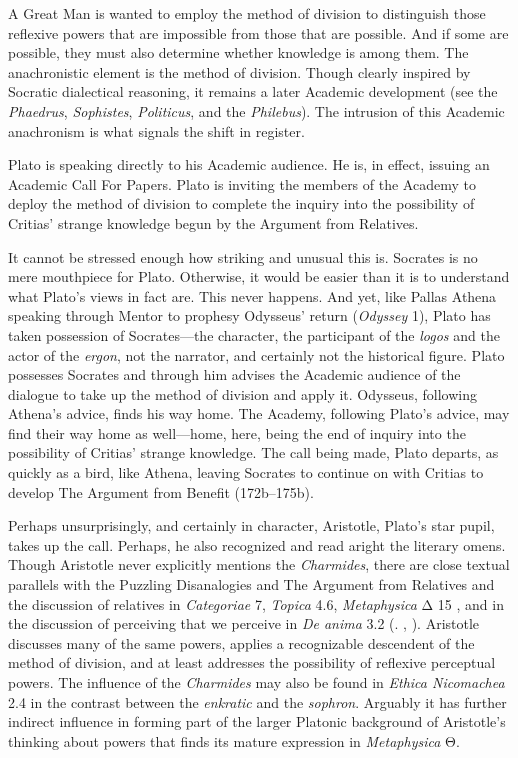 A Great Man is wanted to employ the method of division to distinguish those reflexive powers that are impossible from those that are possible. And if some are possible, they must also determine whether knowledge is among them. The anachronistic element is the method of division. Though clearly inspired by Socratic dialectical reasoning, it remains a later Academic development (see the \emph{Phaedrus}, \emph{Sophistes}, \emph{Politicus}, and the \emph{Philebus}). The intrusion of this Academic anachronism is what signals the shift in register.

Plato is speaking directly to his Academic audience. He is, in effect, issuing an Academic Call For Papers. Plato is inviting the members of the Academy to deploy the method of division to complete the inquiry into the possibility of Critias' strange knowledge begun by the Argument from Relatives. 

It cannot be stressed enough how striking and unusual this is. Socrates is no mere mouthpiece for Plato. Otherwise, it would be easier than it is to understand what Plato's views in fact are. This never happens. And yet, like Pallas Athena speaking through Mentor to prophesy Odysseus' return (\emph{Odyssey} 1), Plato has taken possession of Socrates—the character, the participant of the \emph{logos} and the actor of the \emph{ergon}, not the narrator, and certainly not the historical figure. Plato possesses Socrates and through him advises the Academic audience of the dialogue to take up the method of division and apply it. Odysseus, following Athena's advice, finds his way home. The Academy, following Plato's advice, may find their way home as well—home, here, being the end of inquiry into the possibility of Critias' strange knowledge. The call being made, Plato departs, as quickly as a bird, like Athena, leaving Socrates to continue on with Critias to develop The Argument from Benefit (172b–175b).

Perhaps unsurprisingly, and certainly in character, Aristotle, Plato's star pupil, takes up the call. Perhaps, he also recognized and read aright the literary omens. Though Aristotle never explicitly mentions the \emph{Charmides}, there are close textual parallels with the Puzzling Disanalogies and The Argument from Relatives and the discussion of relatives in \emph{Categoriae} 7, \emph{Topica} 4.6, \emph{Metaphysica} {\sbl Δ} 15 \citep{Duncombe:2020gi}, and in the discussion of perceiving that we perceive in \emph{De anima} 3.2 (\citealt{caston02}. \citealt{McCabe:2007jb}, \citealt{Kosman:2014ab}). Aristotle discusses many of the same powers, applies a recognizable descendent of the method of division, and at least addresses the possibility of reflexive perceptual powers. The influence of the \emph{Charmides} may also be found in \emph{Ethica Nicomachea} 2.4 in the contrast between the \emph{enkratic} and the \emph{sophron}. Arguably it has further indirect influence in forming part of the larger Platonic background of Aristotle's thinking about powers that finds its mature expression in \emph{Metaphysica} {\sbl Θ}.

